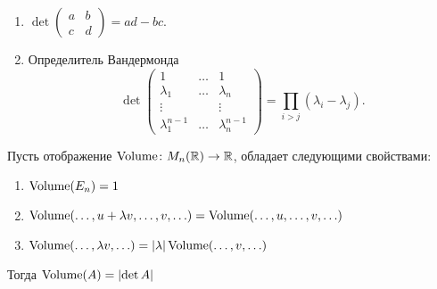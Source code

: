 \begin{ex}
    \begin{enumerate}[noitemsep]
        \item $ \det 
	    \begin{pmatrix}
		a & b\\ c&d 
	    \end{pmatrix} = ad - bc$.
	\item Определитель Вандермонда
	    \[
	    \det 
	    \begin{pmatrix}
		1 & \ldots & 1\\
		\lambda _1 & \ldots & \lambda _n \\
		\vdots & & \vdots \\
		\lambda_1^{n-1} & \ldots & \lambda _n^{n-1}
	    \end{pmatrix}
	    = \prod_{i > j} (\lambda_i - \lambda _j)
	    .\] 
    \end{enumerate} 
\end{ex}
\begin{st}
    Пусть отображение  $ \operatorname{Volume}\colon M_n(\mathbb{R}) \to  \mathbb{R}$, обладает следующими свойствами:
    \begin{enumerate}[noitemsep]
	\item $ \operatorname{Volume}(E_n) = 1$
	\item  $ \operatorname{Volume}(\ldots , u + \lambda  v, \ldots , v, \ldots ) = \operatorname{Volume}(\ldots , u, \ldots , v, \ldots )$ 
	\item $ \operatorname{Volume}(\ldots, \lambda v, \ldots ) = \lvert \lambda  \rvert \operatorname{Volume} (\ldots , v, \ldots )$
    \end{enumerate} 
    Тогда $ \operatorname{Volume} (A) = \lvert \det A \rvert $
\end{st}
% 
